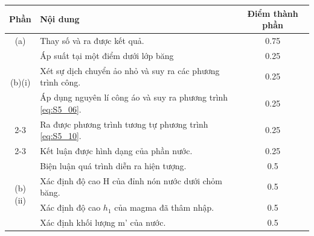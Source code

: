     \begin{center}
    \begin{tabular}{|c|p{8cm}|c|}
    \hline
    \multicolumn{1}{|l|}{Phần} & Nội dung & Điểm thành phần \\ 
    \hline
\multirow{1}{*}{(a)} & Thay số và ra được kết quả.
                     & 0.75
                     \\
                     \hline  
\multirow{3}{*}{(b)(i)} & Áp suất tại một điểm dưới lớp băng                                  
                     & 0.25             
                     \\
                     \cline{2-3}
                     & Xét sự dịch chuyển ảo nhỏ và suy ra các phương trình công. 
                     & 0.25
                     \\
                     \cline{2-3}
                     & Áp dụng nguyên lí công áo và suy ra phương trình \eqref{eq:S5_06}. 
                     & 0.25
                     \\
                     \cline{2-3}
                     & Ra được phương trình tương tự phương trình \eqref{eq:S5_10}. 
                     & 0.25
                     \\
                     \cline{2-3}
                     & Kết luận được hình dạng của phần nước. 
                     & 0.25
                     \\
                     \hline
\multirow{4}{*}{(b)(ii)}& Biện luận quá trình diễn ra hiện tượng.
                     & 0.5    
                     \\
                     \cline{2-3}
                     & Xác định độ cao H của đỉnh nón nước dưới chỏm băng. 
                     & 0.5
                     \\
                     \cline{2-3}
                     & Xác định độ cao $h_1$ của magma đã thâm nhập. 
                     & 0.5
                     \\
                     \cline{2-3}
                     & Xác định khối lượng m' của nước. 
                     & 0.5
                     \\
                     \hline
    \end{tabular}
    \end{center}

